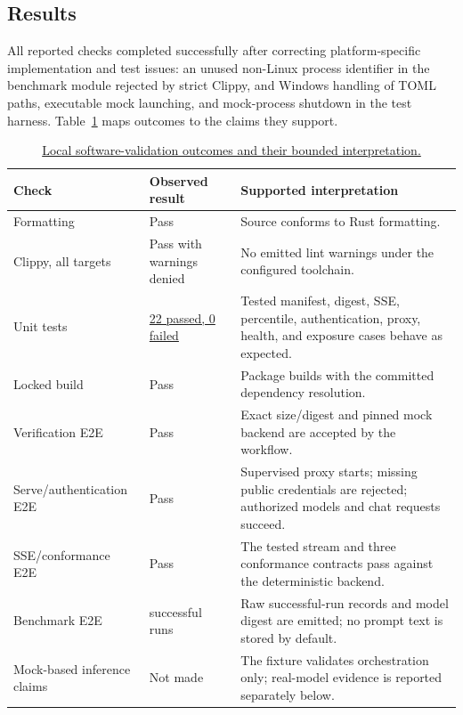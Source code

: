 \documentclass[11pt,a4paper]{article}
\newcommand{\artifact}[2]{\href{https://github.com/BiVelio/caleta/blob/evidence-v1.1/#1}{#2}}
\begin{document}
\subsection{Results}

All reported checks completed successfully after correcting platform-specific implementation and test issues: an unused non-Linux process identifier in the benchmark module rejected by strict Clippy, and Windows handling of TOML paths, executable mock launching, and mock-process shutdown in the test harness. Table~\ref{tab:results} maps outcomes to the claims they support.

\begin{table}[ht]
\centering
\small
\begin{tabular}{>{\raggedright\arraybackslash}p{}>{\raggedright\arraybackslash}p{}>{\raggedright\arraybackslash}p{}}
\toprule
Check & Observed result & Supported interpretation \\
\midrule
Formatting & Pass & Source conforms to Rust formatting. \\
Clippy, all targets & Pass with warnings denied & No emitted lint warnings under the configured toolchain. \\
Unit tests & \artifact{experiments/software-validation/results/windows-latest/unit_tests.json}{22 passed, 0 failed} & Tested manifest, digest, SSE, percentile, authentication, proxy, health, and exposure cases behave as expected. \\
Locked build & Pass & Package builds with the committed dependency resolution. \\
Verification E2E & Pass & Exact size/digest and pinned mock backend are accepted by the workflow. \\
Serve/authentication E2E & Pass & Supervised proxy starts; missing public credentials are rejected; authorized models and chat requests succeed. \\
SSE/conformance E2E & Pass & The tested stream and three conformance contracts pass against the deterministic backend. \\
Benchmark E2E & 2 successful runs & Raw successful-run records and model digest are emitted; no prompt text is stored by default. \\
Mock-based inference claims & Not made & The fixture validates orchestration only; real-model evidence is reported separately below. \\
\bottomrule
\end{tabular}
\caption{\artifact{experiments/software-validation/results/table1-software-validation.json}{Local software-validation outcomes and their bounded interpretation.}}
\label{tab:results}
\end{table}
\end{document}
